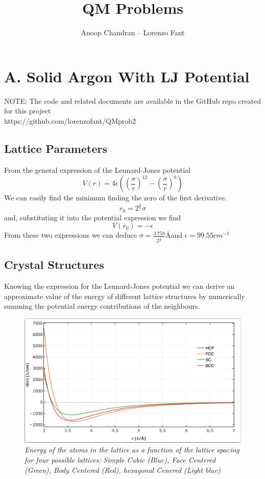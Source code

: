 \documentclass[a4paper]{article}
\title{QM Problems}
\author{Anoop Chandran -- Lorenzo Fant}
\begin{document}
\maketitle


\section{A. Solid Argon With LJ Potential}
NOTE: The code and related documents are available in the GitHub repo created for this project \\
https://github.com/lorenzofant/QMprob2
\subsection{Lattice Parameters}
From the general expression of the Lennard-Jones potential
\begin{equation}
V(r) = 4\epsilon\left(\left(\frac{\sigma}{r}\right)^12-\left(\frac{\sigma}{r}\right)^6\right)
\end{equation}
We can easily find the minimum finding the zero of the first derivative.
\begin{equation}
r_0 = 2^{\frac{1}{6}}\sigma
\end{equation}
and, substituting it into the potential expression we find
\begin{equation}
V(r_0) = -\epsilon
\end{equation}
From these two expressions we can deduce $\sigma = \frac{3.758}{2^{\frac{1}{6}}}$\AA and $\epsilon = 99.55 cm^{-1}$
\subsection{Crystal Structures}
Knowing the expression for the Lennard-Jones potential we can derive an approximate value of the energy of different lattice structures by numerically summing the potential energy contributions of the neighbours.
\begin{figure}[h]
    \centering
    \includegraphics[width=12cm]{lj.png}
    \caption{\it \label{en(spacing)}Energy of the atoms in the lattice as a function of the lattice spacing for four possible lattices: Simple Cubic (Blue), Face Centered (Green), Body Centered (Red), hexagonal Cenered (Light blue)}
\end{figure}
    
\end{document}
